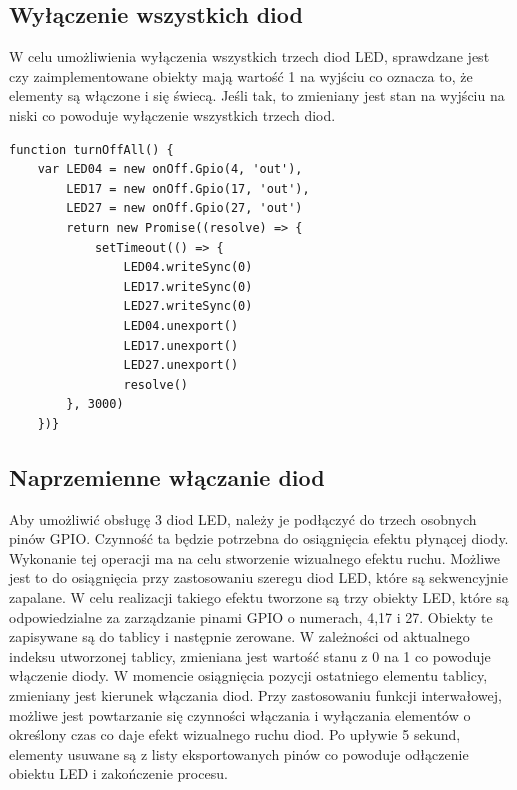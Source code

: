 \subsection{Wyłączenie wszystkich diod}
W celu umożliwienia wyłączenia wszystkich trzech diod LED, sprawdzane jest czy zaimplementowane obiekty mają wartość 1 na wyjściu co oznacza to, że elementy są włączone i się świecą. Jeśli tak, to zmieniany jest stan na wyjściu na niski co powoduje wyłączenie wszystkich trzech diod. 
 \begin{lstlisting}[caption=Implementacja funkcji wylaczajaca wszystkie diody]
function turnOffAll() {
    var LED04 = new onOff.Gpio(4, 'out'),
        LED17 = new onOff.Gpio(17, 'out'),
        LED27 = new onOff.Gpio(27, 'out')
        return new Promise((resolve) => {
        	setTimeout(() => {
	            LED04.writeSync(0)
	            LED17.writeSync(0)
	            LED27.writeSync(0)
	            LED04.unexport()
	            LED17.unexport()
	            LED27.unexport()
	            resolve()
        }, 3000)
    })}
\end{lstlisting}

\subsection{Naprzemienne włączanie diod}
Aby umożliwić obsługę 3 diod LED, należy je podłączyć do trzech osobnych pinów GPIO. Czynność ta będzie potrzebna do osiągnięcia efektu płynącej diody. Wykonanie tej operacji ma na celu stworzenie wizualnego efektu ruchu. Możliwe jest to do osiągnięcia przy zastosowaniu szeregu diod LED, które są sekwencyjnie zapalane. W celu realizacji takiego efektu tworzone są trzy obiekty LED, które są odpowiedzialne za zarządzanie pinami GPIO o numerach, 4,17 i 27. Obiekty te zapisywane są do tablicy i następnie zerowane. W zależności od aktualnego indeksu utworzonej tablicy, zmieniana jest wartość stanu z 0 na 1 co powoduje włączenie diody. W momencie osiągnięcia pozycji ostatniego elementu tablicy, zmieniany jest kierunek włączania diod. Przy zastosowaniu funkcji interwałowej, możliwe jest powtarzanie się czynności włączania i wyłączania elementów o określony czas co daje efekt wizualnego ruchu diod. Po upływie 5 sekund, elementy usuwane są z listy eksportowanych pinów co powoduje odłączenie obiektu LED i zakończenie procesu.





